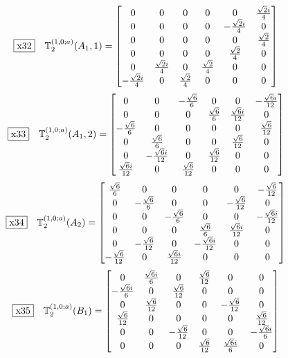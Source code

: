 \documentclass[fleqn,10pt,landscape]{jsarticle}
\begin{document}
\begin{dmath*}
\fbox{x32}\quad \mathbb{T}_{2}^{(1,0;a)}(A_{1},1)=\begin{bmatrix} 0 & 0 & 0 & 0 & 0 & \frac{\sqrt{2} i}{4} \\ 0 & 0 & 0 & 0 & - \frac{\sqrt{2} i}{4} & 0 \\ 0 & 0 & 0 & 0 & 0 & \frac{\sqrt{2}}{4} \\ 0 & 0 & 0 & 0 & \frac{\sqrt{2}}{4} & 0 \\ 0 & \frac{\sqrt{2} i}{4} & 0 & \frac{\sqrt{2}}{4} & 0 & 0 \\ - \frac{\sqrt{2} i}{4} & 0 & \frac{\sqrt{2}}{4} & 0 & 0 & 0 \end{bmatrix}
\end{dmath*}
\begin{dmath*}
\fbox{x33}\quad \mathbb{T}_{2}^{(1,0;a)}(A_{1},2)=\begin{bmatrix} 0 & 0 & - \frac{\sqrt{6}}{6} & 0 & 0 & - \frac{\sqrt{6} i}{12} \\ 0 & 0 & 0 & \frac{\sqrt{6}}{6} & \frac{\sqrt{6} i}{12} & 0 \\ - \frac{\sqrt{6}}{6} & 0 & 0 & 0 & 0 & \frac{\sqrt{6}}{12} \\ 0 & \frac{\sqrt{6}}{6} & 0 & 0 & \frac{\sqrt{6}}{12} & 0 \\ 0 & - \frac{\sqrt{6} i}{12} & 0 & \frac{\sqrt{6}}{12} & 0 & 0 \\ \frac{\sqrt{6} i}{12} & 0 & \frac{\sqrt{6}}{12} & 0 & 0 & 0 \end{bmatrix}
\end{dmath*}
\begin{dmath*}
\fbox{x34}\quad \mathbb{T}_{2}^{(1,0;a)}(A_{2})=\begin{bmatrix} \frac{\sqrt{6}}{6} & 0 & 0 & 0 & 0 & - \frac{\sqrt{6}}{12} \\ 0 & - \frac{\sqrt{6}}{6} & 0 & 0 & - \frac{\sqrt{6}}{12} & 0 \\ 0 & 0 & - \frac{\sqrt{6}}{6} & 0 & 0 & - \frac{\sqrt{6} i}{12} \\ 0 & 0 & 0 & \frac{\sqrt{6}}{6} & \frac{\sqrt{6} i}{12} & 0 \\ 0 & - \frac{\sqrt{6}}{12} & 0 & - \frac{\sqrt{6} i}{12} & 0 & 0 \\ - \frac{\sqrt{6}}{12} & 0 & \frac{\sqrt{6} i}{12} & 0 & 0 & 0 \end{bmatrix}
\end{dmath*}
\begin{dmath*}
\fbox{x35}\quad \mathbb{T}_{2}^{(1,0;a)}(B_{1})=\begin{bmatrix} 0 & \frac{\sqrt{6} i}{6} & 0 & \frac{\sqrt{6}}{12} & 0 & 0 \\ - \frac{\sqrt{6} i}{6} & 0 & \frac{\sqrt{6}}{12} & 0 & 0 & 0 \\ 0 & \frac{\sqrt{6}}{12} & 0 & 0 & - \frac{\sqrt{6}}{12} & 0 \\ \frac{\sqrt{6}}{12} & 0 & 0 & 0 & 0 & \frac{\sqrt{6}}{12} \\ 0 & 0 & - \frac{\sqrt{6}}{12} & 0 & 0 & - \frac{\sqrt{6} i}{6} \\ 0 & 0 & 0 & \frac{\sqrt{6}}{12} & \frac{\sqrt{6} i}{6} & 0 \end{bmatrix}
\end{dmath*}
\end{document}
